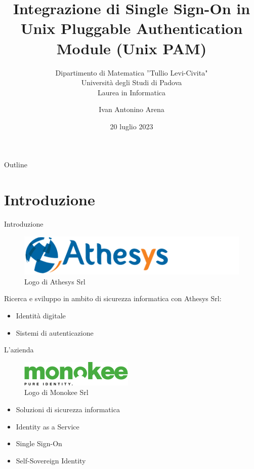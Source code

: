 \documentclass{beamer}
\title{Integrazione di Single Sign-On in Unix Pluggable Authentication Module (Unix PAM)}
\subtitle{Dipartimento di Matematica ”Tullio Levi-Civita" \\ Università degli Studi di Padova \\ Laurea in Informatica}
\author{Ivan Antonino Arena}
\date{20 luglio 2023}
\begin{document}
	\maketitle

	\begin{frame}{Outline}
		\tableofcontents
	\end{frame}


	\section{Introduzione}
	
	\begin{frame}{Introduzione}
		
		\begin{figure}[H] 
			\centering 
			\includegraphics[width=0.4\columnwidth]{immagini/logo-athesys} 
			\caption{Logo di Athesys Srl}
			\label{fig:athesys}
		\end{figure}
		
		Ricerca e sviluppo in ambito di sicurezza informatica con Athesys Srl:
		
		\begin{itemize}
			\item Identità digitale \vspace{.5em}
			\item Sistemi di autenticazione \vspace{.5em}
		\end{itemize}
	\end{frame}
	
	
	\begin{frame}{L'azienda}
		\begin{figure}[H] 
			\centering 
			\includegraphics[width=0.4\columnwidth]{immagini/logo-monokee} 
			\caption{Logo di Monokee Srl}
			\label{fig:monokee}
		\end{figure}


		\begin{itemize}
			\item Soluzioni di sicurezza informatica \vspace{.5em}
			\item Identity as a Service \vspace{.5em}
			\item Single Sign-On \vspace{.5em}
			\item Self-Sovereign Identity \vspace{.5em}
		\end{itemize}	
	\end{frame}
	
\end{document}
